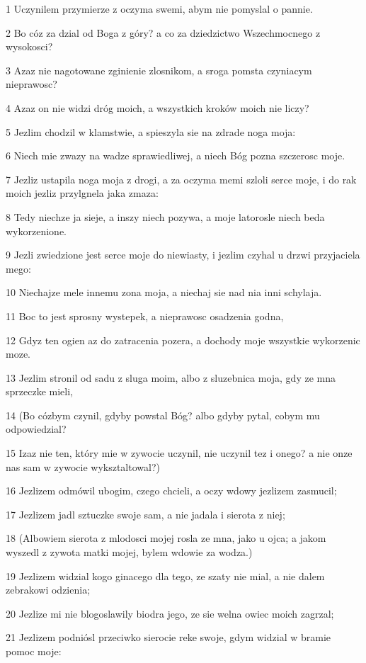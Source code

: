 \par 1 Uczynilem przymierze z oczyma swemi, abym nie pomyslal o pannie.
\par 2 Bo cóz za dzial od Boga z góry? a co za dziedzictwo Wszechmocnego z wysokosci?
\par 3 Azaz nie nagotowane zginienie zlosnikom, a sroga pomsta czyniacym nieprawosc?
\par 4 Azaz on nie widzi dróg moich, a wszystkich kroków moich nie liczy?
\par 5 Jezlim chodzil w klamstwie, a spieszyla sie na zdrade noga moja:
\par 6 Niech mie zwazy na wadze sprawiedliwej, a niech Bóg pozna szczerosc moje.
\par 7 Jezliz ustapila noga moja z drogi, a za oczyma memi szloli serce moje, i do rak moich jezliz przylgnela jaka zmaza:
\par 8 Tedy niechze ja sieje, a inszy niech pozywa, a moje latorosle niech beda wykorzenione.
\par 9 Jezli zwiedzione jest serce moje do niewiasty, i jezlim czyhal u drzwi przyjaciela mego:
\par 10 Niechajze mele innemu zona moja, a niechaj sie nad nia inni schylaja.
\par 11 Boc to jest sprosny wystepek, a nieprawosc osadzenia godna,
\par 12 Gdyz ten ogien az do zatracenia pozera, a dochody moje wszystkie wykorzenic moze.
\par 13 Jezlim stronil od sadu z sluga moim, albo z sluzebnica moja, gdy ze mna sprzeczke mieli,
\par 14 (Bo cózbym czynil, gdyby powstal Bóg? albo gdyby pytal, cobym mu odpowiedzial?
\par 15 Izaz nie ten, który mie w zywocie uczynil, nie uczynil tez i onego? a nie onze nas sam w zywocie wyksztaltowal?)
\par 16 Jezlizem odmówil ubogim, czego chcieli, a oczy wdowy jezlizem zasmucil;
\par 17 Jezlizem jadl sztuczke swoje sam, a nie jadala i sierota z niej;
\par 18 (Albowiem sierota z mlodosci mojej rosla ze mna, jako u ojca; a jakom wyszedl z zywota matki mojej, bylem wdowie za wodza.)
\par 19 Jezlizem widzial kogo ginacego dla tego, ze szaty nie mial, a nie dalem zebrakowi odzienia;
\par 20 Jezlize mi nie blogoslawily biodra jego, ze sie welna owiec moich zagrzal;
\par 21 Jezlizem podniósl przeciwko sierocie reke swoje, gdym widzial w bramie pomoc moje:
